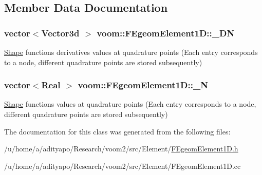 \subsection{Member Data Documentation}
\hypertarget{classvoom_1_1_f_egeom_element1_d_ac24d6f4aa2a37ac19e703b1af4053d17}{
\subsubsection[{\_\-DN}]{\setlength{\rightskip}{0pt plus 5cm}vector$<$Vector3d $>$ {\bf voom::FEgeomElement1D::\_\-DN}}}
\label{classvoom_1_1_f_egeom_element1_d_ac24d6f4aa2a37ac19e703b1af4053d17}
\hyperlink{classvoom_1_1_shape}{Shape} functions derivatives values at quadrature points (Each entry corresponds to a node, different quadrature points are stored subsequently) \hypertarget{classvoom_1_1_f_egeom_element1_d_a3fdff0f1167383a0aaddad60100debe7}{
\subsubsection[{\_\-N}]{\setlength{\rightskip}{0pt plus 5cm}vector$<$Real $>$ {\bf voom::FEgeomElement1D::\_\-N}}}
\label{classvoom_1_1_f_egeom_element1_d_a3fdff0f1167383a0aaddad60100debe7}
\hyperlink{classvoom_1_1_shape}{Shape} functions values at quadrature points (Each entry corresponds to a node, different quadrature points are stored subsequently) 

The documentation for this class was generated from the following files:\begin{DoxyCompactItemize}
\item 
/u/home/a/adityapo/Research/voom2/src/Element/\hyperlink{_f_egeom_element1_d_8h}{FEgeomElement1D.h}\item 
/u/home/a/adityapo/Research/voom2/src/Element/FEgeomElement1D.cc\end{DoxyCompactItemize}
